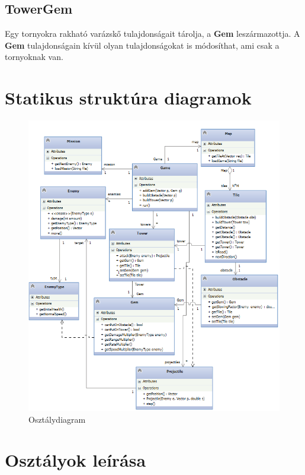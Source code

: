 \subsection{TowerGem}
Egy tornyokra rakható varázskő tulajdonságait tárolja, a \textbf{Gem} leszármazottja. A \textbf{Gem} tulajdonságain kívül olyan tulajdonságokat is módosíthat, ami csak a tornyoknak van.


\section{Statikus struktúra diagramok}

\begin{figure}[H]
\begin{center}
\includegraphics[width=17cm]{images/class.png}
\caption{Osztálydiagram}
\label{fig:class_diag}
\end{center}
\end{figure}


\section{Osztályok leírása}


